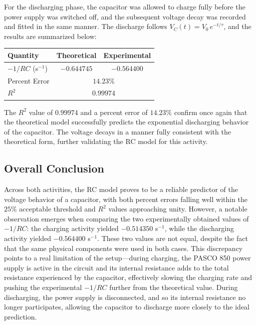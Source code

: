 \documentclass[12pt]{article}
\begin{document}
For the discharging phase, the capacitor was allowed to charge fully
before the power supply was switched off, and the subsequent voltage
decay was recorded and fitted in the same manner. The discharge follows
$V_C(t) = V_0\, e^{-t/\tau}$, and the results are summarized below:

\begin{center}
\begin{tabular}{lcc}
\toprule
\textbf{Quantity} & \textbf{Theoretical} & \textbf{Experimental} \\
\midrule
$-1/RC$ (s$^{-1}$) & $-0.644745$ & $-0.564400$ \\
Percent Error       & \multicolumn{2}{c}{$14.23\%$} \\
$R^2$               & \multicolumn{2}{c}{$0.99974$} \\
\bottomrule
\end{tabular}
\end{center}

The $R^2$ value of $0.99974$ and a percent error of $14.23\%$ confirm
once again that the theoretical model successfully predicts the
exponential discharging behavior of the capacitor. The voltage decays
in a manner fully consistent with the theoretical form, further
validating the RC model for this activity.

\subsection*{Overall Conclusion}

Across both activities, the RC model proves to be a reliable predictor
of the voltage behavior of a capacitor, with both percent errors
falling well within the $25\%$ acceptable threshold and $R^2$ values
approaching unity. However, a notable observation emerges when comparing
the two experimentally obtained values of $-1/RC$: the charging activity
yielded $-0.514350$ s$^{-1}$, while the discharging activity yielded
$-0.564400$ s$^{-1}$. These two values are not equal, despite the fact
that the same physical components were used in both cases. This
discrepancy points to a real limitation of the setup---during charging,
the PASCO 850 power supply is active in the circuit and its internal
resistance adds to the total resistance experienced by the capacitor,
effectively slowing the charging rate and pushing the experimental
$-1/RC$ further from the theoretical value. During discharging, the
power supply is disconnected, and so its internal resistance no longer
participates, allowing the capacitor to discharge more closely to the
ideal prediction.
\end{document}
